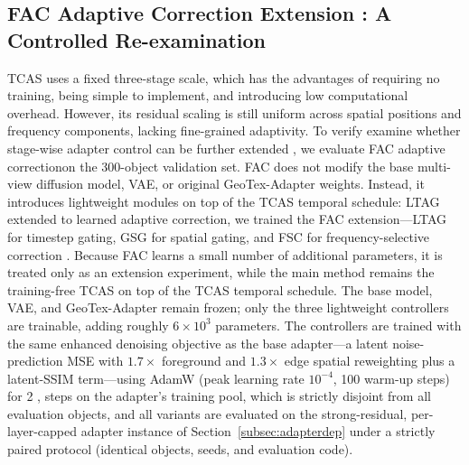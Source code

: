 \documentclass[times,twocolumn,final]{elsarticle}
\providecommand{\DIFadd}[1]{{\protect\color{blue} \sf #1}} %
\providecommand{\DIFdel}[1]{{\protect\color{red} \scriptsize #1}} %
\providecommand{\DIFaddbegin}{} %
\providecommand{\DIFaddend}{} %
\providecommand{\DIFdelbegin}{} %
\providecommand{\DIFdelend}{} %
\newcommand{\DIFscaledelfig}{0.5}
\newlength{\DIFdelgraphicswidth} %
\newlength{\DIFdelgraphicsheight} %
\newcommand{\DIFaddincludegraphics}[2][]{{\color{blue}\fbox{\DIFOincludegraphics[#1]{#2}}}} %
\newcommand{\DIFdelincludegraphics}[2][]{%
\sbox{\DIFdelgraphicsbox}{\DIFOincludegraphics[#1]{#2}}%
\settoboxwidth{\DIFdelgraphicswidth}{\DIFdelgraphicsbox} %
\settoboxtotalheight{\DIFdelgraphicsheight}{\DIFdelgraphicsbox} %
\scalebox{\DIFscaledelfig}{%
\parbox[b]{\DIFdelgraphicswidth}{\usebox{\DIFdelgraphicsbox}\\[-\baselineskip] \rule{\DIFdelgraphicswidth}{0em}}\llap{\resizebox{\DIFdelgraphicswidth}{\DIFdelgraphicsheight}{%
\setlength{\unitlength}{\DIFdelgraphicswidth}%
\begin{picture}(1,1)%
\thicklines\linethickness{2pt} %
{\color[rgb]{1,0,0}\put(0,0){\framebox(1,1){}}}%
{\color[rgb]{1,0,0}\put(0,0){\line( 1,1){1}}}%
{\color[rgb]{1,0,0}\put(0,1){\line(1,-1){1}}}%
\end{picture}%
}\hspace*{3pt}}} %
} %
\DeclareRobustCommand{\DIFaddbegin}{\DIFOaddbegin \let\includegraphics\DIFaddincludegraphics} %
\DeclareRobustCommand{\DIFaddend}{\DIFOaddend \let\includegraphics\DIFOincludegraphics} %
\DeclareRobustCommand{\DIFdelbegin}{\DIFOdelbegin \let\includegraphics\DIFdelincludegraphics} %
\DeclareRobustCommand{\DIFdelend}{\DIFOaddend \let\includegraphics\DIFOincludegraphics} %
\begin{document}
\DIFaddend \subsection{FAC Adaptive Correction Extension\DIFaddbegin \DIFadd{: A Controlled Re-examination}\DIFaddend }
\label{subsec:facexp}

TCAS uses a fixed three-stage scale, which has the advantages of requiring no training, being simple to implement, and introducing low computational overhead. However, its residual scaling is still uniform across spatial positions and frequency components, lacking fine-grained adaptivity. To \DIFdelbegin \DIFdel{verify }\DIFdelend \DIFaddbegin \DIFadd{examine }\DIFaddend whether stage-wise adapter control can be \DIFdelbegin \DIFdel{further extended , we evaluate FAC adaptive correctionon the 300-object validation set. FAC does not modify the base multi-view diffusion model, VAE, or original GeoTex-Adapter weights. Instead, it introduces lightweight modules on top of the TCAS temporal schedule: LTAG }\DIFdelend \DIFaddbegin \DIFadd{extended to learned adaptive correction, we trained the FAC extension---LTAG }\DIFaddend for timestep gating, GSG for spatial gating, and FSC for frequency-selective correction \DIFdelbegin \DIFdel{. Because FAC learns a small number of additional parameters, it is treated only as an extension experiment, while the main method remains the training-free TCAS}\DIFdelend \DIFaddbegin \DIFadd{on top of the TCAS temporal schedule. The base model, VAE, and GeoTex-Adapter remain frozen; only the three lightweight controllers are trainable, adding roughly $6\times10^{3}$ parameters. The controllers are trained with the same enhanced denoising objective as the base adapter---a latent noise-prediction MSE with $1.7\times$ foreground and $1.3\times$ edge spatial reweighting plus a latent-SSIM term---using AdamW (peak learning rate $10^{-4}$, 100 warm-up steps) for 2}{\DIFadd{,}}\DIFadd{000 steps on the adapter's training pool, which is strictly disjoint from all evaluation objects, and all variants are evaluated on the strong-residual, per-layer-capped adapter instance of Section~\ref{subsec:adapterdep} under a strictly paired protocol (identical objects, seeds, and evaluation code)}\DIFaddend .
\end{document}
